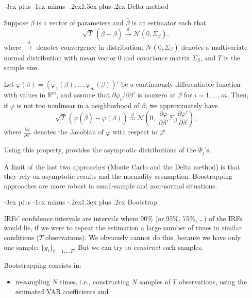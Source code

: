 \documentclass[
  11pt,
]{book}
\makeatletter
\providecommand{\tightlist}{%
  \setlength{\itemsep}{0pt}\setlength{\parskip}{0pt}}
\renewcommand\section{\@startsection{section}{1}{\z@}
  {-3ex plus -1ex minus -.2ex}{1.3ex plus .2ex}
  {\normalfont\Large\bfseries\color{TextbookInk}}}
\theoremstyle{definition}
\theoremstyle{definition}
\theoremstyle{definition}
\theoremstyle{definition}
\theoremstyle{remark}
\makeatother
\begin{document}
\section{Delta method}\label{Delta}

Suppose \(\beta\) is a vector of parameters and \(\hat\beta\) is an estimator such that
\[
\sqrt{T}\,(\hat\beta-\beta)\overset{d}{\longrightarrow}\mathcal{N}(0,\Sigma_\beta),
\]
where \(\overset{d}{\longrightarrow}\) denotes convergence in distribution, \(\mathcal{N}(0,\Sigma_\beta)\) denotes a multivariate normal distribution with mean vector \(0\) and covariance matrix \(\Sigma_\beta\), and \(T\) is the sample size.

Let \(\varphi(\beta) = (\varphi_1(\beta),\dots,\varphi_m(\beta))'\) be a continuously differentiable function with values in \(\mathbb{R}^m\), and assume that \(\partial \varphi_i/\partial \beta'\) is nonzero at \(\beta\) for \(i = 1,\dots,m\). Then, if \(\varphi\) is not too nonlinear in a neighborhood of \(\beta\), we approximately have
\[
\sqrt{T}\,(\varphi(\hat\beta)-\varphi(\beta))
\overset{d}{\approx}
\mathcal{N}\!\left(
0,\;
\frac{\partial \varphi}{\partial \beta'}
\Sigma_\beta
\frac{\partial \varphi'}{\partial \beta}
\right),
\]
where \(\frac{\partial \varphi}{\partial \beta'}\) denotes the Jacobian of \(\varphi\) with respect to \(\beta'\).

Using this property, \citet{Lutkepohl_1990} provides the asymptotic distributions of the \(\Psi_j\)'s.

A limit of the last two approaches (Monte Carlo and the Delta method) is that they rely on asymptotic results and the normality assumption. Boostrapping approaches are more robust in small-sample and non-normal situations.

\section{Bootstrap}\label{Bootstrap1}

IRFs' confidence intervals are intervals where 90\% (or 95\%, 75\%, \ldots) of the IRFs would lie, if we were to repeat the estimation a large number of times in similar conditions (\(T\) observations). We obviously cannot do this, because we have only one sample: \(\{y_t\}_{t=1,..,T}\). But we can try to \emph{construct} such samples.

Bootstrapping consists in:

\begin{itemize}
\tightlist
\item
  re-sampling \(N\) times, i.e., constructing \(N\) samples of \(T\) observations, using the estimated
  VAR coefficients and
\end{itemize}
\end{document}
